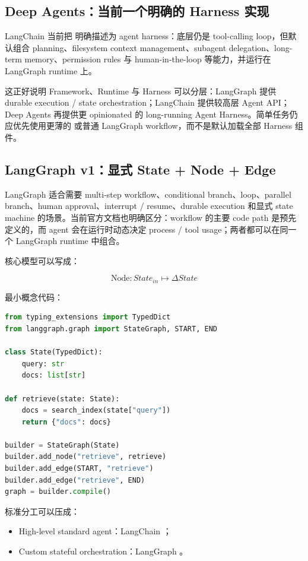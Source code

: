 \documentclass[profile=standard,twoside=false]{ipara-handbook}
\begin{document}
\subsection{Deep Agents：当前一个明确的 Harness 实现}

LangChain 当前把  明确描述为 agent harness：底层仍是 tool-calling loop，但默认组合 planning、filesystem context management、subagent delegation、long-term memory、permission rules 与 human-in-the-loop 等能力，并运行在 LangGraph runtime 上。

这正好说明 Framework、Runtime 与 Harness 可以分层：LangGraph 提供 durable execution / state orchestration；LangChain 提供较高层 Agent API；Deep Agents 再提供更 opinionated 的 long-running Agent Harness。简单任务仍应优先使用更薄的  或普通 LangGraph workflow，而不是默认加载全部 Harness 组件。

\subsection{LangGraph v1：显式 State + Node + Edge}

LangGraph 适合需要 multi-step workflow、conditional branch、loop、parallel branch、human approval、interrupt / resume、durable execution 和显式 state machine 的场景。当前官方文档也明确区分：workflow 的主要 code path 是预先定义的，而 agent 会在运行时动态决定 process / tool usage；两者都可以在同一个 LangGraph runtime 中组合。

核心模型可以写成：

$$
\boxed{\text{Node}: State_{in}\mapsto \Delta State}
$$

最小概念代码：

\begin{lstlisting}[language=Python]
from typing_extensions import TypedDict
from langgraph.graph import StateGraph, START, END

class State(TypedDict):
    query: str
    docs: list[str]

def retrieve(state: State):
    docs = search_index(state["query"])
    return {"docs": docs}

builder = StateGraph(State)
builder.add_node("retrieve", retrieve)
builder.add_edge(START, "retrieve")
builder.add_edge("retrieve", END)
graph = builder.compile()
\end{lstlisting}

标准分工可以压成：

\begin{itemize}
  \item High-level standard agent：LangChain ；
  \item Custom stateful orchestration：LangGraph 。
\end{itemize}
\end{document}
